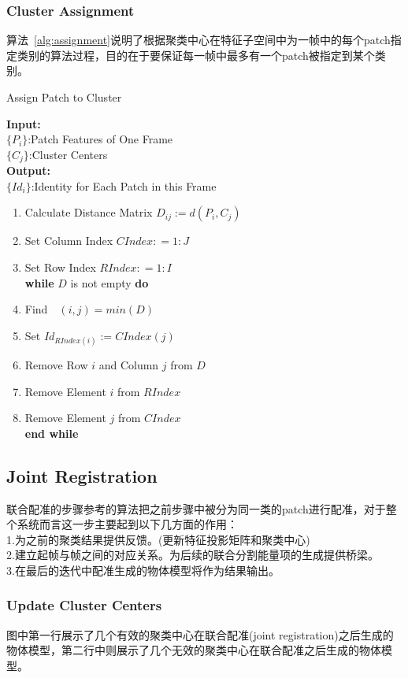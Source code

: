 \subsubsection{Cluster Assignment}
算法~\ref{alg:assignment}说明了根据聚类中心在特征子空间中为一帧中的每个patch指定类别的算法过程，目的在于要保证每一帧中最多有一个patch被指定到某个类别。
\begin{algorithm}[htb]
\caption{Assign Patch to Cluster}
\label{alg:assignment}
\textbf{Input:}~~\\
$\{P_i\}$:Patch Features of One Frame~~\\
$\{C_j\}$:Cluster Centers~~\\
\textbf{Output:}~~\\
$\{Id_i\}$:Identity for Each Patch in this Frame
\begin{enumerate}
\item Calculate Distance Matrix $D_{ij}:=d(P_i,C_j)$
\item Set Column Index $CIndex: = 1:J$
\item Set Row Index $RIndex: = 1:I$\\
\textbf{while} $D$ is not empty \textbf{do}
\item Find~~$(i,j)=min(D)$
\item Set $Id_{RIndex(i)}:=CIndex(j)$
\item Remove Row $i$ and Column $j$ from $D$
\item Remove Element $i$ from $RIndex$
\item Remove Element $j$ from $CIndex$\\
\textbf{end while}
\end{enumerate}
\end{algorithm}
\subsection{Joint Registration}
\label{subsec:registration}
联合配准的步骤参考\cite{Evangelidis-ECCV-2014}的算法把之前步骤中被分为同一类的patch进行配准，对于整个系统而言这一步主要起到以下几方面的作用：\\
1.为之前的聚类结果提供反馈。(更新特征投影矩阵和聚类中心)\\
2.建立起帧与帧之间的对应关系。为后续的联合分割能量项的生成提供桥梁。\\
3.在最后的迭代中配准生成的物体模型将作为结果输出。\\
\subsubsection{Update Cluster Centers}
图中第一行展示了几个有效的聚类中心在联合配准(joint registration)之后生成的物体模型，第二行中则展示了几个无效的聚类中心在联合配准之后生成的物体模型。
